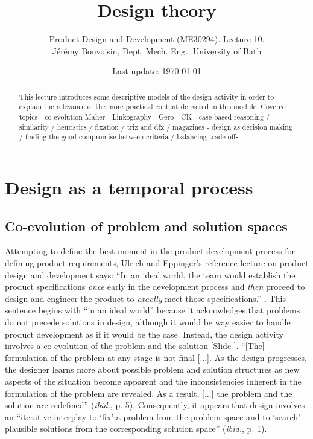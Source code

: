 \documentclass{article}
\newcounter{slide}
\begin{document}
\title{Design theory}

\author{Product Design and Development (ME30294). Lecture 10. \\ Jérémy Bonvoisin, Dept. Mech. Eng., University of Bath}
\date{Last update: \today}

\maketitle

\begin{abstract}
This lecture introduces some descriptive models of the design activity in order to explain the relevance of the more practical content delivered in this module. 
Covered topics
- co-evolution Maher
- Linkography 
- Gero
- CK
- case based reasoning / similarity / heuristics / fixation / triz and dfx / magazines
- design as decision making / finding the good compromise between criteria / balancing trade offs
\end{abstract}

\tableofcontents

\section{Design as a temporal process}
\label{sec:temporal}

\subsection{Co-evolution of problem and solution spaces}
\label{sec:coevolution}
Attempting to define the best moment in the product development process for defining product requirements, Ulrich and Eppinger's reference lecture on product design and development says: ``In an ideal world, the team would establish the product specifications \emph{once} early in the development process and \emph{then} proceed to design and engineer the product to \emph{exactly} meet those specifications.'' \cite[p. 73, emphases are not in the original text]{ulrichProductDesignDevelopment2011}. This sentence begins with ``in an ideal world'' because it acknowledges that problems do not precede solutions in design, although it would be way easier to handle product development as if it would be the case. Instead, the design activity involves a co-evolution of the problem and the solution \cite{maherFormalisingDesignExploration1996} {\color{blue}[Slide ]}. ``[The] formulation of the problem at any stage is not final [...]. As the design progresses, the designer learns more about possible problem and solution structures as new aspects of the situation become apparent and the inconsistencies inherent in the formulation of the problem are revealed. As a result, [...] the problem and the solution are redefined'' (\emph{ibid.}, p. 5). Consequently, it appears that design involves an ``iterative interplay to `fix' a problem from the problem space and to `search' plausible solutions from the corresponding solution space'' (\emph{ibid.}, p. 1).
\end{document}
